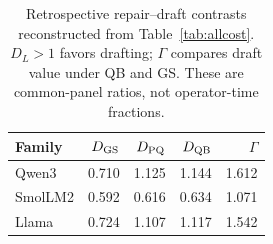 \begin{table}[t]\centering\small
\caption{Retrospective repair--draft contrasts reconstructed from Table~\ref{tab:allcost}. $D_L>1$ favors drafting; $\Gamma$ compares draft value under QB and GS. These are common-panel ratios, not operator-time fractions.}\label{tab:repairinteraction}
\setlength{\tabcolsep}{3pt}
\begin{tabular}{@{}lrrrr@{}}\toprule
Family & $D_{\mathrm{GS}}$ & $D_{\mathrm{PQ}}$ & $D_{\mathrm{QB}}$ & $\Gamma$\\\midrule
Qwen3 & 0.710 & 1.125 & 1.144 & 1.612\\
SmolLM2 & 0.592 & 0.616 & 0.634 & 1.071\\
Llama & 0.724 & 1.107 & 1.117 & 1.542\\
\bottomrule\end{tabular}
\end{table}
